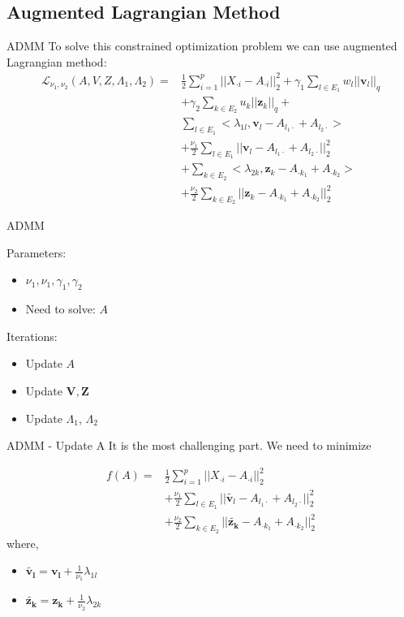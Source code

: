 \documentclass{beamer}
\begin{document}
\subsection{Augmented Lagrangian Method}
\begin{frame}{ADMM}
To solve this constrained optimization problem we can use augmented Lagrangian method:
$$
\begin{aligned}
\mathcal{L}_{\nu_1,\nu_2}(A,V,Z,\Lambda_1, \Lambda_2) = & \frac{1}{2} \sum^p_{i=1} ||X_{\cdot i} - A_{\cdot i}||_2^2 + \gamma_1 \sum_{ l \in E_1 } w_{l} ||\mathbf{v}_l||_{q} \\
 & + \gamma_2 \sum_{k \in E_2 } u_{k} ||\mathbf{z}_k||_{q} + \\
  & \sum_{l \in E_1}<\lambda_{1l},\mathbf{v}_l - A_{l_1 \cdot} + A_{l_2 \cdot} > \\
  & +  \frac{\nu_1}{2} \sum_{l \in E_1} ||\mathbf{v}_l - A_{l_1 \cdot} + A_{l_2 \cdot}||_2^2 \\
  & + \sum_{k \in E_2}<\lambda_{2k},\mathbf{z}_k - A_{\cdot k_1 } + A_{\cdot k_2} > \\
  &+ \frac{\nu_2}{2}\sum_{k \in E_2} || \mathbf{z}_k - A_{\cdot k_1 } + A_{\cdot k_2}||_2^2
\end{aligned}
$$
\end{frame}


\begin{frame}{ADMM}

Parameters:
\begin{itemize}
    \item  $\nu_1, \nu_1 , \gamma_1, \gamma_2$
    \item Need to solve: $A$
\end{itemize}
Iterations: 
\begin{itemize}
    \item Update $A$
    \item Update $\mathbf{V}, \mathbf{Z}$
    \item Update $\Lambda_1$, $\Lambda_2$
\end{itemize}
\end{frame}

\begin{frame}{ADMM - Update A}
    It is the most challenging part. We need to minimize 

$$
\begin{aligned}
    f(A) =& \frac{1}{2} \sum^p_{i=1} ||X_{\cdot i} - A_{\cdot i}||_2^2  \\
     & + \frac{\nu_1}{2}\sum_{l \in E_1} ||\tilde{\mathbf{v}_l} - A_{l_1 \cdot} + A_{l_2 \cdot} ||^2_2 \\
     & + \frac{\nu_2}{2} \sum_{k \in E_2} ||\tilde{\mathbf{z_k}} - A_{\cdot k_1 } + A_{\cdot k_2}||^2_2   
\end{aligned}
$$    
    where,
    \begin{itemize}
        \item $\tilde{\mathbf{v_l}} = \mathbf{v_l} + \frac{1}{\nu_1} \lambda_{1l}$
        \item $\tilde{\mathbf{z_k}} = \mathbf{z_k} + \frac{1}{\nu_2} \lambda_{2k}$
    \end{itemize}
\end{frame}
\end{document}
